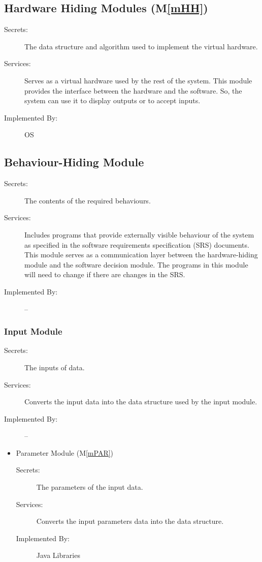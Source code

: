 \documentclass[12pt, titlepage]{article}
\newcommand{\mref}[1]{M\ref{#1}}
\begin{document}
\subsection{Hardware Hiding Modules (\mref{mHH})}
\begin{description}
\item[Secrets:]The data structure and algorithm used to implement the virtual
  hardware.
\item[Services:]Serves as a virtual hardware used by the rest of the
  system. This module provides the interface between the hardware and the
  software. So, the system can use it to display outputs or to accept inputs.
\item[Implemented By:] OS
\end{description}


\subsection{Behaviour-Hiding Module}
\begin{description}
\item[Secrets:]The contents of the required behaviours.
\item[Services:]Includes programs that provide externally visible behaviour of
  the system as specified in the software requirements specification (SRS)
  documents. This module serves as a communication layer between the
  hardware-hiding module and the software decision module. The programs in this
  module will need to change if there are changes in the SRS.
\item[Implemented By:] --
\end{description}


\subsubsection{Input Module}
\begin{description}
\item[Secrets:]The inputs of data.
\item[Services:]Converts the input data into the data structure used by the input module.
\item[Implemented By:] --
\end{description}

\begin{itemize}
\item{Parameter Module (\mref{mPAR})}
\begin{description}
\item[Secrets:]The parameters of the input data.
\item[Services:]Converts the input parameters data into the data structure.
\item[Implemented By:] Java Libraries
\end{description}
\end{itemize}
\end{document}

